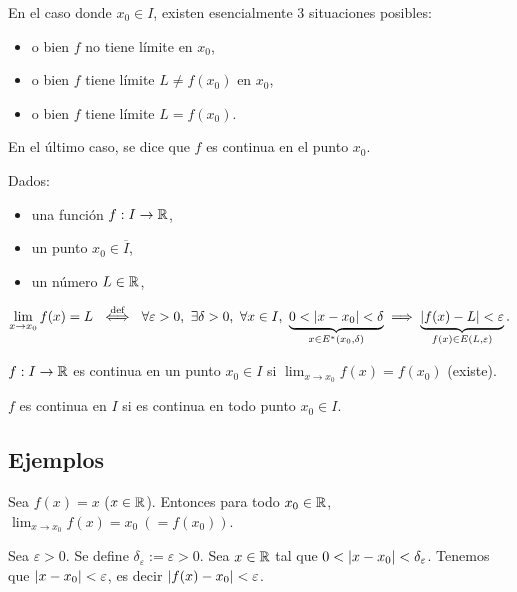 \documentclass[11pt,a4paper]{article}
\newcommand{\Er}{E^{*}}                 %
\newcommand{\Cl}[1]{\overline{#1}}      %
\begin{document}
\begin{observacion}
En el caso donde $x_0\in I$, existen esencialmente 3 situaciones posibles:
\begin{itemize}
  \item o bien $f$ no tiene límite en $x_0$,
  \item o bien $f$ tiene límite $L\neq f(x_0)$ en $x_0$,
  \item o bien $f$ tiene límite $L=f(x_0)$.
\end{itemize}
En el último caso, se dice que $f$ es continua en el punto $x_0$.
\end{observacion}


Dados:
\begin{itemize}
  \item una función $f:I\to\mathbb{R}$,
  \item un punto $x_0\in\Cl{I}$,
  \item un número $L\in\mathbb{R}$,
\end{itemize}
\[
  \lim_{x\to x_0}f(x)=L \ \overset{\text{def}}{\iff}\ \forall\varepsilon>0,\ \exists\delta>0,\ \forall x\in I,\ \underbrace{0<\abs{x-x_0}<\delta}_{x\in\Er(x_0,\delta)} \implies \underbrace{\abs{f(x)-L}<\varepsilon}_{f(x)\in E(L,\varepsilon)}.
\]

\begin{definicion}
$f:I\to\mathbb{R}$ es continua en un punto $x_0\in I$ si $\displaystyle\lim_{x\to x_0}f(x)=f(x_0)$ (existe).
\end{definicion}

\begin{definicion}
$f$ es continua en $I$ si es continua en todo punto $x_0\in I$.
\end{definicion}

\subsection{Ejemplos}

\begin{ejemplo}[Identidad]
Sea $f(x)=x$ ($x\in\mathbb{R}$). Entonces para todo $x_0\in\mathbb{R}$, $\displaystyle\lim_{x\to x_0}f(x)=x_0\ (=f(x_0))$.

Sea $\varepsilon>0$. Se define $\delta_\varepsilon:=\varepsilon>0$. Sea $x\in\mathbb{R}$ tal que $0<\lvert x-x_0\rvert<\delta_\varepsilon$. Tenemos que $\lvert x-x_0\rvert<\varepsilon$, es decir $\lvert f(x)-x_0\rvert<\varepsilon$.
\end{ejemplo}
\end{document}
